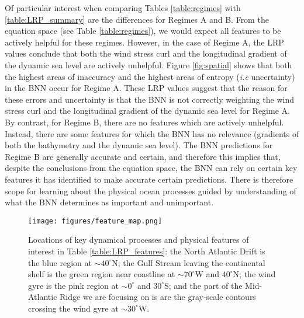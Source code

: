\documentclass[a4paper]{article}
\begin{document}
Of particular interest when comparing Tables \ref{table:regimes} with \ref{table:LRP_summary} are the differences for Regimes A and B. From the equation space (see Table \ref{table:regimes}), we would expect all features to be actively helpful for these regimes. However, in the case of Regime A, the LRP values conclude that both the wind stress curl and the longitudinal gradient of the dynamic sea level are actively unhelpful. Figure \ref{fig:spatial} shows that both the highest areas of inaccuracy and the highest areas of entropy (\textit{i.e} uncertainty) in the BNN occur for Regime A. These LRP values suggest that the reason for these errors and uncertainty is that the BNN is not correctly weighting the wind stress curl and the longitudinal gradient of the dynamic sea level for Regime A. By contrast, for Regime B, there are no features which are actively unhelpful. Instead, there are some features for which the BNN has no relevance (gradients of both the bathymetry and the dynamic sea level). The BNN predictions for Regime B are generally accurate and certain, and therefore this implies that, despite the conclusions from the equation space, the BNN can rely on certain key features it has identified to make accurate certain predictions. There is therefore scope for learning about the physical ocean processes guided by understanding of what the BNN determines as important and unimportant.

\begin{figure}
    \centering
    \texttt{[image: figures/feature\_map.png]}
    \caption{Locations of key dynamical processes and physical features of interest in Table \ref{table:LRP_features}: the North Atlantic Drift is the blue region at $\sim 40^{\circ}$N; the Gulf Stream leaving the continental shelf is the green region near coastline at $\sim 70^{\circ}$W and $40^{\circ}$N; the wind gyre is the pink region at $\sim 0^{\circ}$ and $30^{\circ}$S; and the part of the Mid-Atlantic Ridge we are focusing on is are the gray-scale contours crossing the wind gyre at $\sim 30^{\circ}$W.}  
    \label{fig:feature_map}
\end{figure}
\end{document}
